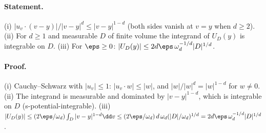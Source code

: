 \paragraph{Statement.} (i) $|u_v\cdot(v-y)|/|v-y|^d\leq|v-y|^{1-d}$ (both sides vanish at $v=y$ when
$d\geq2$). (ii) For $d\geq1$ and measurable $D$ of finite volume the integrand of $U_D(y)$ is integrable
on $D$. (iii) For $\eps\geq0$: $|U_D(y)|\leq2d\eps\,\omega_d^{-1/d}|D|^{1/d}$.
\paragraph{Proof.} (i) Cauchy--Schwarz with $|u_v|\leq1$: $|u_v\cdot w|\leq|w|$, and $|w|/|w|^d=|w|^{1-d}$ for
$w\neq0$. (ii) The integrand is measurable and dominated by $|v-y|^{1-d}$, which is integrable on $D$
(s-potential-integrable). (iii) $|U_D(y)|\leq(2\eps/\omega_d)\int_D|v-y|^{1-d}\dd v
\leq(2\eps/\omega_d)\,d\,\omega_d(|D|/\omega_d)^{1/d}=2d\eps\,\omega_d^{-1/d}|D|^{1/d}$.
